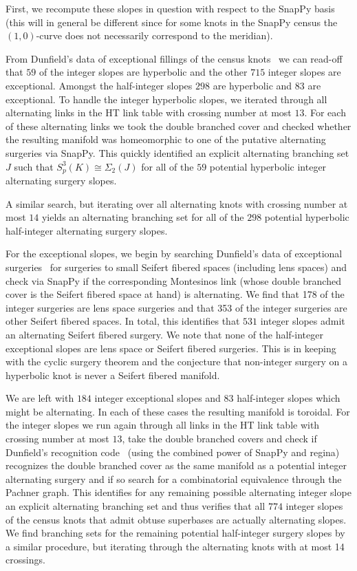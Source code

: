 \documentclass{amsart} %
\theoremstyle{thm}
\theoremstyle{definition}
\numberwithin{equation}{section}
\begin{document}
First, we recompute these slopes in question with respect to the SnapPy basis (this will in general be different since for some knots in the SnapPy census the $(1,0)$-curve does not necessarily correspond to the meridian).

From Dunfield's data of exceptional fillings of the census knots~\cite{Du18} we can read-off that $59$ of the integer slopes are hyperbolic and the other $715$ integer slopes are exceptional. Amongst the half-integer slopes $298$ are hyperbolic and $83$ are exceptional. To handle the integer hyperbolic slopes, we iterated through all alternating links in the HT link table with crossing number at most $13$. For each of these alternating links we took the double branched cover and checked whether the resulting manifold was homeomorphic to one of the putative alternating surgeries via SnapPy. This quickly identified an explicit alternating branching set $J$ such that $S_{p}^3(K)\cong \Sigma_2(J)$ for all of the $59$ potential hyperbolic integer alternating surgery slopes.

A similar search, but iterating over all alternating knots with crossing number at most $14$ yields an alternating branching set for all of the $298$ potential hyperbolic half-integer alternating surgery slopes.

For the exceptional slopes, we begin by searching Dunfield's data of exceptional surgeries~\cite{Du18} for surgeries to small Seifert fibered spaces (including lens spaces) and check via SnapPy if the corresponding Montesinos link (whose double branched cover is the Seifert fibered space at hand) is alternating. We find that 178 of the integer surgeries are lens space surgeries and that 353 of the integer surgeries are other Seifert fibered spaces. In total, this identifies that $531$ integer slopes admit an alternating Seifert fibered surgery. We note that none of the half-integer exceptional slopes are lens space or Seifert fibered surgeries. This is in keeping with the cyclic surgery theorem and the conjecture that non-integer surgery on a hyperbolic knot is never a Seifert fibered manifold.

We are left with $184$ integer exceptional slopes and $83$ half-integer slopes which might be alternating. In each of these cases the resulting manifold is toroidal. For the integer slopes we run again through all links in the HT link table with crossing number at most $13$, take the double branched covers and check if Dunfield's recognition code~\cite{Du18} (using the combined power of SnapPy and regina) recognizes the double branched cover as the same manifold as a potential integer alternating surgery and if so search for a combinatorial equivalence through the Pachner graph. This identifies for any remaining possible alternating integer slope an explicit alternating branching set and thus verifies that all $774$ integer slopes of the census knots that admit obtuse superbases are actually alternating slopes. We find branching sets for the remaining potential half-integer surgery slopes by a similar procedure, but iterating through the alternating knots with at most 14 crossings.
\end{document}
